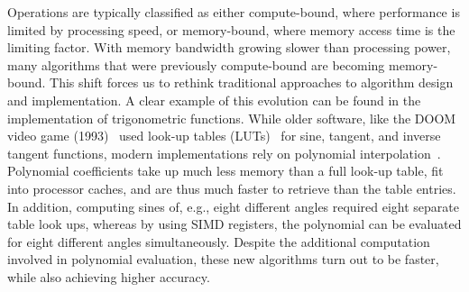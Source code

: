 \normalcaptionwidth
\captionwidth{\linewidth}
\begin{figure}[h]
    \centering

    \hspace{0.025\textwidth}%
    \begin{minipage}[t]{0.42\textwidth}
      \centering
      \label{fig:in:memory-wall}
    \end{minipage}%
    \hspace{0.03\textwidth}%
    \begin{minipage}[t]{0.42\textwidth}
      \centering
      \label{fig:in:nvidia-gpus}
    \end{minipage}%
\end{figure}
\changecaptionwidth
{}

Operations are typically classified as either compute-bound, where performance is limited by processing speed, or memory-bound, where memory access time is the limiting factor. With memory bandwidth growing slower than processing power, many algorithms that were previously compute-bound are becoming memory-bound. This shift forces us to rethink traditional approaches to algorithm design and implementation. A clear example of this evolution can be found in the implementation of trigonometric functions. While older software, like the DOOM video game (1993)~ used look-up tables (LUTs)~ for sine, tangent, and inverse tangent functions, modern implementations rely on polynomial interpolation~. Polynomial coefficients take up much less memory than a full look-up table, fit into processor caches, and are thus much faster to retrieve than the table entries. In addition, computing sines of, e.g., eight different angles required eight separate table look ups, whereas by using SIMD registers, the polynomial can be evaluated for eight different angles simultaneously. Despite the additional computation involved in polynomial evaluation, these new algorithms turn out to be faster, while also achieving higher accuracy.

